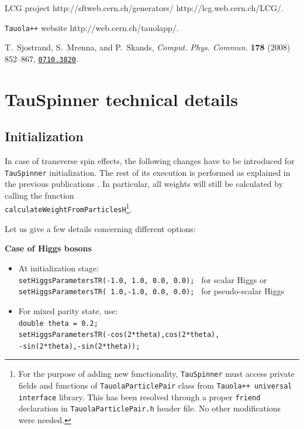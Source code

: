 \documentclass[12pt]{article}
\begin{document}
\begin{thebibliography}{10}
LCG project http://sftweb.cern.ch/generators/ http://lcg.web.cern.ch/LCG/.

{\tt Tauola++} website http://web.cern.ch/tauolapp/.

T.~Sjostrand, S.~Mrenna, and P.~Skands, {\em Comput. Phys. Commun.} {\bf 178}
  (2008) 852--867,
\href{http://www.arXiv.org/abs/0710.3820}{{\tt 0710.3820}}.

\end{thebibliography}\endgroup

%



\appendix
\newpage
\section{TauSpinner technical details}
\label{sec:technical}

\subsection{Initialization}

In case of transverse spin effects, the following changes have to be introduced 
for {\tt TauSpinner} initialization. The rest of its execution is performed as explained in the 
previous publications \cite{Czyczula:2012ny,Banerjee:2012ez}. In particular, all weights will still be calculated 
by calling the function\\
 {\tt calculateWeightFromParticlesH}\footnote{For the purpose of adding new functionality, {\tt TauSpinner} must access
private fields and functions of {\tt TauolaParticlePair} class from {\tt Tauola++ universal interface} library.
This has been resolved through a proper {\tt friend} declaration in {\tt TauolaParticlePair.h} header file. No other modifications were needed.}.

Let us give a few details concerning different options:

{\bf Case of Higgs bosons}
\begin{itemize}
\item
At initialization stage: \\
             {\tt setHiggsParametersTR(-1.0, 1.0, 0.0, 0.0); } for scalar Higgs or \\
             {\tt setHiggsParametersTR( 1.0,-1.0, 0.0, 0.0); } for pseudo-scalar Higgs 
\item
For mixed parity state, use: \\
             {\tt double theta = 0.2; } \\
             {\tt setHiggsParametersTR(-cos(2*theta),cos(2*theta), }\\
             {\tt -sin(2*theta),-sin(2*theta)); }
\end{itemize}
\end{document}
